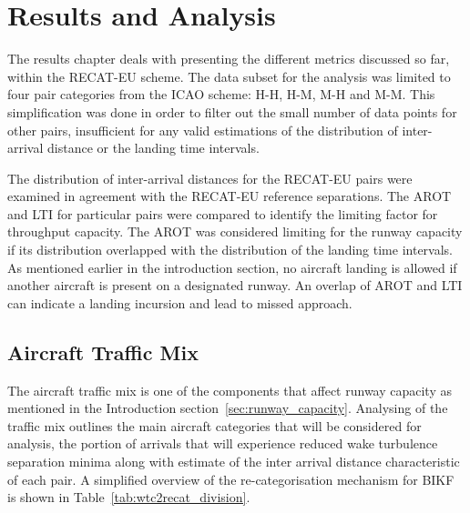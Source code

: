\chapter{Results and Analysis\label{cha:results_analysis}}

The results chapter deals with presenting the different metrics discussed so far, within the RECAT-EU scheme. The data subset for the analysis was limited to four pair categories from the ICAO scheme: H-H, H-M, M-H and M-M. This simplification was done in order to filter out the small number of data points for other pairs, insufficient for any valid estimations of the distribution of inter-arrival distance or the landing time intervals. 

The distribution of inter-arrival distances for the RECAT-EU pairs were examined in agreement with the RECAT-EU reference separations. The AROT and LTI for particular pairs were compared to identify the limiting factor for throughput capacity. The AROT was considered limiting for the runway capacity if its distribution overlapped with the distribution of the landing time intervals. As mentioned earlier in the introduction section, no aircraft landing is allowed if another aircraft is present on a designated runway. An overlap of AROT and LTI can indicate a landing incursion and lead to missed approach.  

\section{Aircraft Traffic Mix\label{sec:traffic_mix}}

The aircraft traffic mix is one of the components that affect runway capacity as mentioned in the Introduction section~\ref{sec:runway_capacity}. Analysing of the traffic mix outlines the main aircraft categories that will be considered for analysis, the portion of arrivals that will experience reduced wake turbulence separation minima along with estimate of the inter arrival distance characteristic of each pair. A simplified overview of the re-categorisation mechanism for BIKF is shown in Table~\ref{tab:wtc2recat_division}.

